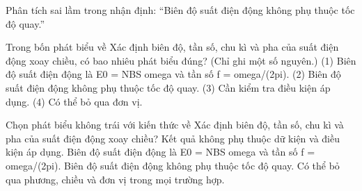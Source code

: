 \begin{bt}
Phân tích sai lầm trong nhận định: “Biên độ suất điện động không phụ thuộc tốc độ quay.”
\end{bt}

\begin{ex}
Trong bốn phát biểu về Xác định biên độ, tần số, chu kì và pha của suất điện động xoay chiều, có bao nhiêu phát biểu đúng? (Chỉ ghi một số nguyên.) (1) Biên độ suất điện động là E0 = NBS omega và tần số f = omega/(2pi). (2) Biên độ suất điện động không phụ thuộc tốc độ quay. (3) Cần kiểm tra điều kiện áp dụng. (4) Có thể bỏ qua đơn vị.
\end{ex}

\begin{ex}
Chọn phát biểu không trái với kiến thức về Xác định biên độ, tần số, chu kì và pha của suất điện động xoay chiều?
\choice
{Kết quả không phụ thuộc dữ kiện và điều kiện áp dụng.}
{\True Biên độ suất điện động là E0 = NBS omega và tần số f = omega/(2pi).}
{Biên độ suất điện động không phụ thuộc tốc độ quay.}
{Có thể bỏ qua phương, chiều và đơn vị trong mọi trường hợp.}
\end{ex}

